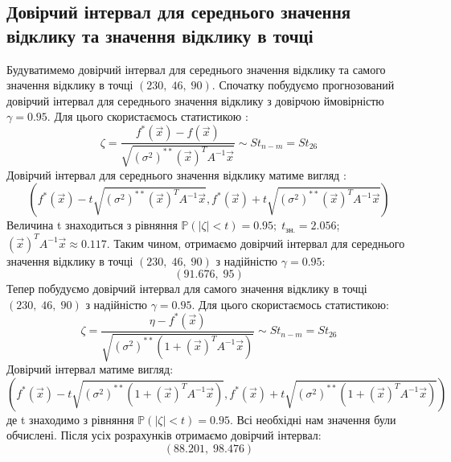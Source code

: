 \documentclass{article}
\begin{document}
    \subsection{Довірчий інтервал для середнього значення відклику та значення відклику в точці}
      Будуватимемо довірчий інтервал для середнього значення відклику та самого 
      значення відклику в точці $ (230, \;46, \;90) $.
      \newline
      Спочатку побудуємо прогнозований довірчий інтервал для середнього значення 
      відклику з довірчою ймовірністю $\gamma = 0.95$. Для цього скористаємось 
      статистикою :
      \begin{equation}
        \zeta = \frac{f^*(\vec{x}) - f(\vec{x})}{\sqrt{(\sigma^2)^{**}(\vec{x})^TA^{-1}\vec{x}}}
        \sim St_{n-m} = St_{26}
      \end{equation}
      Довірчий інтервал для середнього значення відклику матиме вигляд :
      \begin{equation}
        \left( f^*(\vec{x}) - t\sqrt{(\sigma^2)^{**}(\vec{x})^TA^{-1}\vec{x}}, 
        f^*(\vec{x}) + t\sqrt{(\sigma^2)^{**}(\vec{x})^TA^{-1}\vec{x}} \right)
      \end{equation}
      Величина t знаходиться з рівняння $\mathbb{P}(|\zeta| < t) = 0.95; \; t_\text{зн.} = 
      2.056$;\;
      $(\vec{x})^TA^{-1}\vec{x} \approx 0.117$.
      \newline
      Таким чином, отримаємо довірчий інтервал для середнього значення відклику в 
      точці $ (230, \;46, \;90) $ з надійністю $\gamma = 0.95$:
      \begin{equation}
        (91.676,\; 95)
      \end{equation}
      Тепер побудуємо довірчий інтервал для самого значення відклику в точці $ (230, \;46, \;90) $ 
      з надійністю $\gamma = 0.95$. Для цього скористаємось статистикою:
      \begin{equation}
        \zeta = \frac{\eta - f^*(\vec{x})}{\sqrt{(\sigma^2)^{**}(1 + (\vec{x})^TA^{-1}\vec{x})}}      
        \sim St_{n-m} = St_{26}
      \end{equation}
      Довірчий інтервал матиме вигляд:
      \begin{equation}
        \left(f^*(\vec{x}) - t\sqrt{(\sigma^2)^{**}(1 + (\vec{x})^TA^{-1}\vec{x})}, 
        f^*(\vec{x}) + t\sqrt{(\sigma^2)^{**}(1 + (\vec{x})^TA^{-1}\vec{x})}\right)
      \end{equation}
      де t знаходимо з рівняння $\mathbb{P}(|\zeta| < t) = 0.95$.
      Всі необхідні нам значення були обчислені. Після усіх розрахунків отримаємо 
      довірчий інтервал:
      \begin{equation}
        (88.201,\;98.476)
      \end{equation}
\end{document}
